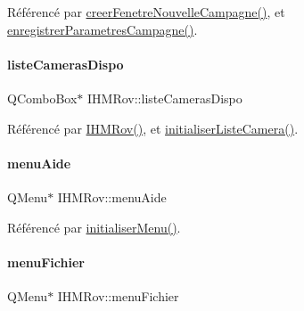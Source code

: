 Référencé par \hyperlink{class_i_h_m_rov_a08bf623a890df272f738c1ff8631213f}{creer\+Fenetre\+Nouvelle\+Campagne()}, et \hyperlink{class_i_h_m_rov_a229194814bfb1fc94ab3cc86d6411921}{enregistrer\+Parametres\+Campagne()}.

\mbox{\label{class_i_h_m_rov_a9b9e5631b8d9b6a9801a6faac8cba0f0}} 
\paragraph{\texorpdfstring{liste\+Cameras\+Dispo}{listeCamerasDispo}}
{\footnotesize\ttfamily Q\+Combo\+Box$\ast$ I\+H\+M\+Rov\+::liste\+Cameras\+Dispo\hspace{0.3cm}{\ttfamily [private]}}



Référencé par \hyperlink{class_i_h_m_rov_a5dac1fb4612866cc61f699a415e0ef6b}{I\+H\+M\+Rov()}, et \hyperlink{class_i_h_m_rov_af3e46f174ab2fdeaebb2d00e6b8bcb33}{initialiser\+Liste\+Camera()}.

\mbox{\label{class_i_h_m_rov_a7de335b17ef7b92fdb203cd385ba874f}} 
\paragraph{\texorpdfstring{menu\+Aide}{menuAide}}
{\footnotesize\ttfamily Q\+Menu$\ast$ I\+H\+M\+Rov\+::menu\+Aide\hspace{0.3cm}{\ttfamily [private]}}



Référencé par \hyperlink{class_i_h_m_rov_aebbcb2325c2d1a88a012d8408e2d6223}{initialiser\+Menu()}.

\mbox{\label{class_i_h_m_rov_ad110a9a5cfabc48491ee602075e28066}} 
\paragraph{\texorpdfstring{menu\+Fichier}{menuFichier}}
{\footnotesize\ttfamily Q\+Menu$\ast$ I\+H\+M\+Rov\+::menu\+Fichier\hspace{0.3cm}{\ttfamily [private]}}



